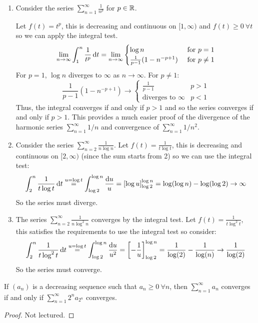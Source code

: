 \documentclass[../main.tex]{subfiles}
\begin{document}
\begin{example}
  \begin{enumerate} \label{integralTestExample}
    \item Consider the series $\sum_{n = 1}^{\infty} \frac{1}{n^{p}}$ for $p \in \mathbb{R}$.

      Let $f(t) = t^{p}$, this is decreasing and continuous on $[1, \infty)$ and $f(t) \geq 0\ \forall t$ so we can apply the integral test.
      \[
        \lim_{n \to \infty}  \int_{1}^{n} \frac{1}{t^{p}} \d{t} = \lim_{n \to \infty} \begin{cases}
        \log n & \text{ for $p = 1$} \\
        \frac{1}{p - 1}(1 - n^{-p + 1}) & \text{ for $p \neq 1$}
        \end{cases}
      \]
      For $p = 1$, $\log n$ diverges to $\infty$ as $n \to \infty$.
      For $p \neq 1$:
      \[
        \frac{1}{p - 1}(1 - n^{-p + 1}) \to \begin{cases}
          \frac{1}{p - 1} & p > 1 \\
          \text{diverges to } \infty & p < 1
        \end{cases}
      \]
      Thus, the integral converges if and only if $p > 1$ and so the series converges if and only if $p > 1$.
      This provides a much easier proof of the divergence of the harmonic series $\sum_{n = 1}^{\infty} 1/n$ and convergence of $\sum_{n = 1}^{\infty} 1/n^2$.
    \item Consider the series $\sum_{n = 2}^{\infty} \frac{1}{n \log n}$.
      Let $f(t) = \frac{1}{t \log t}$, this is decreasing and continuous on $[2, \infty)$ (since the sum starts from 2) so we can use the integral test:
      \[
        \int_2^n \frac{1}{t \log t} \d{t} \stackrel{u = \log t} = \int_{\log 2}^{\log n} \frac{\d{u}}{u} = \eval{\log u}{\log 2}{\log n} = \log(\log n) - \log(\log 2) \to \infty
      \]
      So the series must diverge.
    \item The series $\sum_{n = 2}^{\infty} \frac{1}{n \log^2 n}$ converges by the integral test.
      Let $f(t) = \frac{1}{t\log^2 t}$, this satisfies the requirements to use the integral test so consider:
      \[
        \int_2^n \frac{1}{t \log^2 t} \d{t} \stackrel{u = \log t} = \int_{\log 2}^{\log n} \frac{\d{u}}{u^2} = \eval{-\frac{1}{u}}{\log 2}{\log n} = \frac{1}{\log(2)} - \frac{1}{\log(n)} \to \frac{1}{\log(2)}
      \]
      So the series must converge.
  \end{enumerate}
\end{example}
\begin{proposition}
  If $(a_n)$ is a decreasing sequence such that $a_n \geq 0\ \forall n$, then $\sum_{n = 1}^{\infty} a_n$ converges if and only if $\sum_{n = 1}^{\infty} 2^{n}a_{2^{n}}$ converges.
\end{proposition}
\begin{proof}
  Not lectured.
\end{proof}
\end{document}
